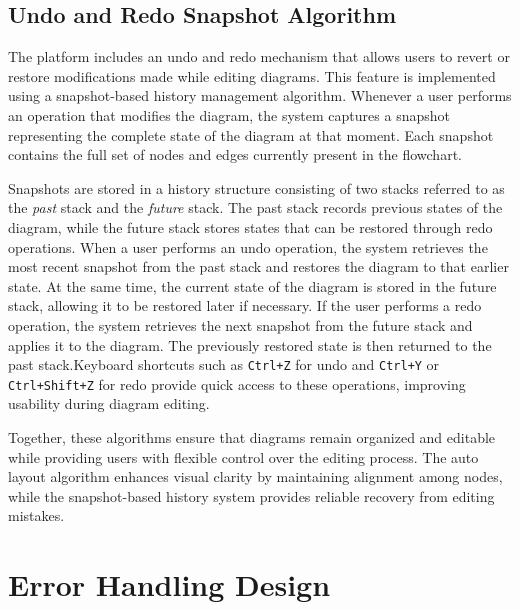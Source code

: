 \subsection{Undo and Redo Snapshot Algorithm}

\justifying
The platform includes an undo and redo mechanism that allows users to revert or restore modifications made while editing diagrams. This feature is implemented using a snapshot-based history management algorithm. Whenever a user performs an operation that modifies the diagram, the system captures a snapshot representing the complete state of the diagram at that moment. Each snapshot contains the full set of nodes and edges currently present in the flowchart.

Snapshots are stored in a history structure consisting of two stacks referred to as the \textit{past} stack and the \textit{future} stack. The past stack records previous states of the diagram, while the future stack stores states that can be restored through redo operations. When a user performs an undo operation, the system retrieves the most recent snapshot from the past stack and restores the diagram to that earlier state. At the same time, the current state of the diagram is stored in the future stack, allowing it to be restored later if necessary. If the user performs a redo operation, the system retrieves the next snapshot from the future stack and applies it to the diagram. The previously restored state is then returned to the past stack.Keyboard shortcuts such as \texttt{Ctrl+Z} for undo and \texttt{Ctrl+Y} or \texttt{Ctrl+Shift+Z} for redo provide quick access to these operations, improving usability during diagram editing.

\justifying
Together, these algorithms ensure that diagrams remain organized and editable while providing users with flexible control over the editing process. The auto layout algorithm enhances visual clarity by maintaining alignment among nodes, while the snapshot-based history system provides reliable recovery from editing mistakes.



\section{Error Handling Design}
\label{sec:error-handling}

